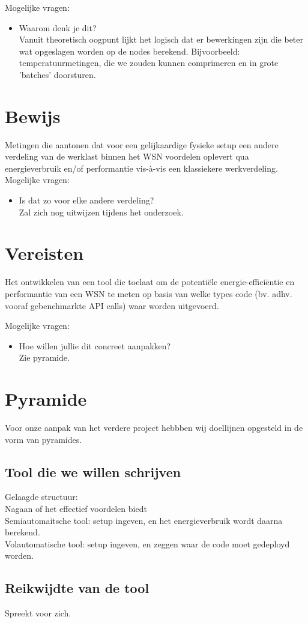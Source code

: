 \documentclass[11pt]{article}
\begin{document}
Mogelijke vragen: 

\begin{itemize}
\item Waarom denk je dit?\\
  Vanuit theoretisch oogpunt lijkt het logisch dat er bewerkingen zijn
die beter wat opgeslagen worden op de nodes berekend. Bijvoorbeeld:
temperatuurmetingen, die we zouden kunnen comprimeren en in grote
'batches' doorsturen.
\end{itemize}
\section{Bewijs}
\label{sec-5}
Metingen die aantonen dat voor een gelijkaardige fysieke setup een
andere verdeling van de werklast binnen het WSN voordelen oplevert qua
energieverbruik en/of performantie vis-à-vis een klassiekere
werkverdeling.\\

Mogelijke vragen: 

\begin{itemize}
\item Is dat zo voor elke andere verdeling?\\
  Zal zich nog uitwijzen tijdens het onderzoek.
\end{itemize}
\section{Vereisten}
\label{sec-6}
Het ontwikkelen van een tool die toelaat om de potentiële
energie-efficiëntie en performantie van een WSN te meten op basis van
welke types code (bv. adhv. vooraf gebenchmarkte API calls) waar
worden uitgevoerd.

Mogelijke vragen: 

\begin{itemize}
\item Hoe willen jullie dit concreet aanpakken?\\
  Zie pyramide.
\end{itemize}

\section{Pyramide}
Voor onze aanpak van het verdere project hebbben wij doellijnen opgesteld in de vorm van pyramides.
\subsection*{Tool die we willen schrijven}
Gelaagde structuur:
\\
Nagaan of het effectief voordelen biedt
\\
Semiautomaitsche tool: setup ingeven, en het energieverbruik wordt daarna berekend.
\\
Volautomatische tool: setup ingeven, en zeggen waar de code moet gedeployd worden.

\subsection*{Reikwijdte van de tool}
Spreekt voor zich.
\end{document}

